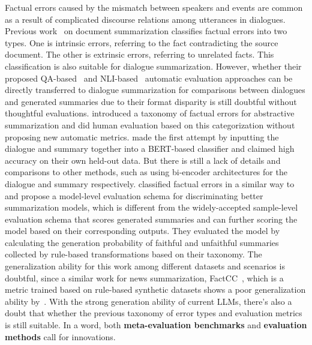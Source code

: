 Factual errors caused by the mismatch between speakers and events are 
common as a result of complicated discourse relations among utterances 
in dialogues. 
Previous work~\cite{huang2021factual} on document summarization classifies 
factual errors into two types. One is intrinsic errors, referring to the fact 
contradicting the source document. The other is extrinsic errors, 
referring to unrelated facts.  %
This classification is also suitable for dialogue summarization. However, whether their proposed 
QA-based~\cite{wang2020asking} and NLI-based~\cite{falke2019ranking} 
automatic evaluation approaches can be directly transferred to 
dialogue summarization for comparisons between dialogues and 
generated summaries due to their format disparity is still doubtful without thoughtful evaluations.
\citet{tang2021confit} introduced a taxonomy of factual errors for abstractive summarization and did human evaluation based on this categorization without proposing new automatic metrics.
\citet{liu2021controllable} made the first attempt by inputting the 
dialogue and summary together into a BERT-based classifier and claimed 
high accuracy on their own held-out data. But there is still a lack of 
details and comparisons to other methods, such as using bi-encoder 
architectures for the dialogue and summary respectively.
\citet{wang2022analyzing} classified factual errors in a similar way to ~\citet{tang2021confit} and propose a model-level evaluation schema for discriminating better summarization models, which is different from the widely-accepted sample-level evaluation schema that scores generated summaries and can further scoring the model based on their corresponding outputs. They evaluated the model by calculating the generation probability of faithful and unfaithful summaries collected by rule-based transformations based on their taxonomy. The generalization ability for this work among different datasets and scenarios is doubtful, since a similar work for news summarization, FactCC~\cite{kryscinski2020evaluating}, which is a metric trained based on rule-based synthetic datasets shows a poor generalization ability by~\citet{laban2022summac}.
With the strong generation ability of current LLMs, there's also a doubt that whether the previous taxonomy of error types and evaluation metrics is still suitable.
In a word, both \textbf{meta-evaluation benchmarks} and \textbf{evaluation methods} call for innovations.




